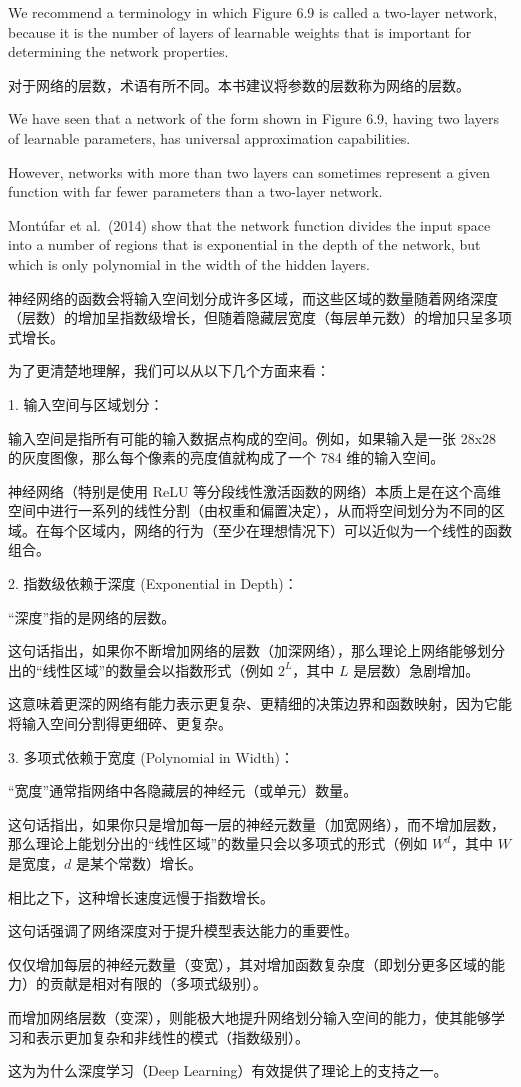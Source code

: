 \documentclass{article}
\begin{document}
We recommend a terminology in which Figure 6.9 is called a two-layer network, because it is the number of layers of learnable weights that is important for determining the network properties.

{\color{red}
对于网络的层数，术语有所不同。本书建议将参数的层数称为网络的层数。
}

We have seen that a network of the form shown in Figure 6.9, having two layers of learnable parameters, has universal approximation capabilities. 

However, networks with more than two layers can sometimes represent a given function with far fewer parameters than a two-layer network. 

Mont\'ufar et al.~(2014) show that the network function divides the input space into a number of regions that is exponential in the depth of the network, but which is only polynomial in the width of the hidden layers. 

{\color{red}

神经网络的函数会将输入空间划分成许多区域，而这些区域的数量随着网络深度（层数）的增加呈指数级增长，但随着隐藏层宽度（每层单元数）的增加只呈多项式增长。

为了更清楚地理解，我们可以从以下几个方面来看：

1.  输入空间与区域划分：

    输入空间是指所有可能的输入数据点构成的空间。例如，如果输入是一张 28x28 的灰度图像，那么每个像素的亮度值就构成了一个 784 维的输入空间。

    神经网络（特别是使用 ReLU 等分段线性激活函数的网络）本质上是在这个高维空间中进行一系列的线性分割（由权重和偏置决定），从而将空间划分为不同的区域。在每个区域内，网络的行为（至少在理想情况下）可以近似为一个线性的函数组合。

2.  指数级依赖于深度 (Exponential in Depth)：

     “深度”指的是网络的层数。

    这句话指出，如果你不断增加网络的层数（加深网络），那么理论上网络能够划分出的“线性区域”的数量会以指数形式（例如 $2^L$，其中 $L$ 是层数）急剧增加。

    这意味着更深的网络有能力表示更复杂、更精细的决策边界和函数映射，因为它能将输入空间分割得更细碎、更复杂。

3.  多项式依赖于宽度 (Polynomial in Width)：

    “宽度”通常指网络中各隐藏层的神经元（或单元）数量。

    这句话指出，如果你只是增加每一层的神经元数量（加宽网络），而不增加层数，那么理论上能划分出的“线性区域”的数量只会以多项式的形式（例如 $W^d$，其中 $W$ 是宽度，$d$ 是某个常数）增长。

    相比之下，这种增长速度远慢于指数增长。

这句话强调了网络深度对于提升模型表达能力的重要性。

仅仅增加每层的神经元数量（变宽），其对增加函数复杂度（即划分更多区域的能力）的贡献是相对有限的（多项式级别）。

而增加网络层数（变深），则能极大地提升网络划分输入空间的能力，使其能够学习和表示更加复杂和非线性的模式（指数级别）。

这为为什么深度学习（Deep Learning）有效提供了理论上的支持之一。
}
\end{document}
